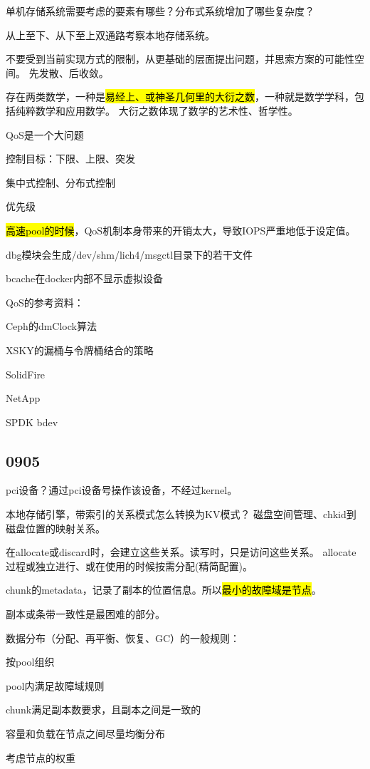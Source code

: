 单机存储系统需要考虑的要素有哪些？分布式系统增加了哪些复杂度？

从上至下、从下至上双通路考察本地存储系统。

不要受到当前实现方式的限制，从更基础的层面提出问题，并思索方案的可能性空间。
先发散、后收敛。

存在两类数学，一种是\hl{易经上、或神圣几何里的大衍之数}，一种就是数学学科，包括纯粹数学和应用数学。
大衍之数体现了数学的艺术性、哲学性。

QoS是一个大问题
\begin{enumbox}
\item 控制目标：下限、上限、突发
\item 集中式控制、分布式控制
\item 优先级
\item \hl{高速pool的时候}，QoS机制本身带来的开销太大，导致IOPS严重地低于设定值。
\item dbg模块会生成/dev/shm/lich4/msgctl目录下的若干文件
\item bcache在docker内部不显示虚拟设备
\end{enumbox}

QoS的参考资料：
\begin{enumbox}
\item Ceph的dmClock算法
\item XSKY的漏桶与令牌桶结合的策略
\item SolidFire
\item NetApp
\item SPDK bdev
\end{enumbox}

\subsection{0905}

pci设备？通过pci设备号操作该设备，不经过kernel。

本地存储引擎，带索引的关系模式怎么转换为KV模式？
磁盘空间管理、chkid到磁盘位置的映射关系。

在allocate或discard时，会建立这些关系。读写时，只是访问这些关系。
allocate过程或独立进行、或在使用的时候按需分配(精简配置)。

chunk的metadata，记录了副本的位置信息。所以\hl{最小的故障域是节点}。

副本或条带一致性是最困难的部分。

数据分布（分配、再平衡、恢复、GC）的一般规则：
\begin{enumbox}
\item 按pool组织
\item pool内满足故障域规则
\item chunk满足副本数要求，且副本之间是一致的
\item 容量和负载在节点之间尽量均衡分布
\item 考虑节点的权重
\end{enumbox}

